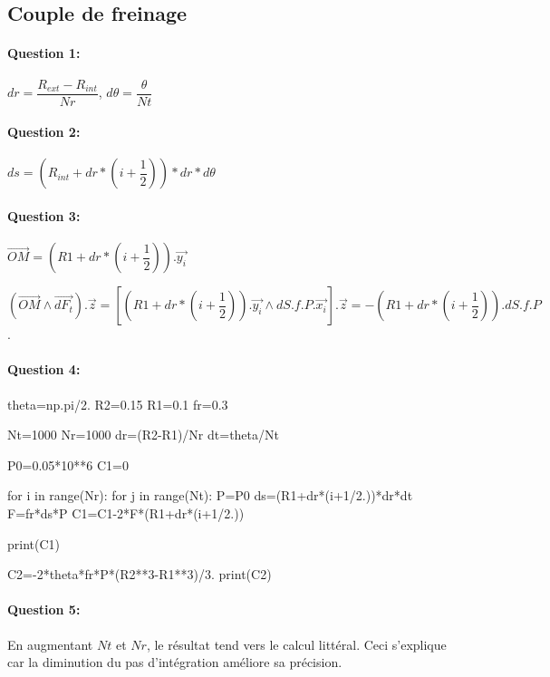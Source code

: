 \subsection{Couple de freinage}

\paragraph{Question 1:} $dr=\dfrac{R_{ext}-R_{int}}{Nr}$, $d\theta=\dfrac{\theta}{Nt}$

\paragraph{Question 2:} $ds=(R_{int}+dr*(i+\dfrac{1}{2}))*dr*d\theta$ 

\paragraph{Question 3:} $\overrightarrow{OM}=(R1+dr*(i+\dfrac{1}{2})).\overrightarrow{y_i}$

$(\overrightarrow{OM}\wedge \overrightarrow{dF_t}).\overrightarrow{z}=\left[(R1+dr*(i+\dfrac{1}{2})).\overrightarrow{y_i}\wedge dS.f.P.\overrightarrow{x_i}\right].\overrightarrow{z}=-(R1+dr*(i+\dfrac{1}{2})).dS.f.P$.

\paragraph{Question 4:} 

\begin{verbatimtab}[3]

theta=np.pi/2.
R2=0.15
R1=0.1
fr=0.3

Nt=1000
Nr=1000
dr=(R2-R1)/Nr
dt=theta/Nt

P0=0.05*10**6
C1=0

for i in range(Nr):
	for j in range(Nt):
		P=P0
		ds=(R1+dr*(i+1/2.))*dr*dt
		F=fr*ds*P
		C1=C1-2*F*(R1+dr*(i+1/2.))  
    
print(C1)

C2=-2*theta*fr*P*(R2**3-R1**3)/3.
print(C2)
\end{verbatimtab}



\paragraph{Question 5:} En augmentant $Nt$ et $Nr$, le résultat tend vers le calcul littéral. Ceci s'explique car la diminution du pas d'intégration améliore sa précision.

